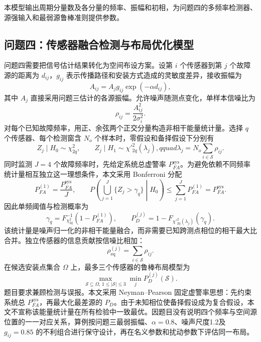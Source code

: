 \documentclass[withoutpreface,bwprint]{cumcmthesis}
\begin{document}
本模型输出周期分量数及各分量的频率、振幅和初相，为问题四的多频率检测器、源强输入和最弱源鲁棒准则提供参数。

\subsection{问题四：传感器融合检测与布局优化模型}

问题四需要把信号估计结果转化为空间布设方案。设第 \(i\) 个传感器到第 \(j\) 个故障源的距离为 \(d_{ij}\)，\(g_{ij}\) 表示传播路径和安装方式造成的灵敏度差异，接收振幅为
\begin{equation}
    A_{ij}=A_jg_{ij}\exp(-\alpha d_{ij}),
    \label{eq:decay}
\end{equation}
其中 \(A_j\) 直接采用问题三估计的各源振幅。允许噪声随测点变化，单样本信噪比为
\begin{equation}
    \rho_{ij}=
    \frac{A_{ij}^2}{2\sigma_i^2}.
    \label{eq:rho}
\end{equation}
对每个已知故障频率，用正、余弦两个正交分量构造非相干能量统计量。选择 \(q\) 个传感器、每个检测窗含 \(N_o\) 个样本时，零假设和备择假设下分别有
\begin{equation}
 Z_j\mid H_0\sim\chi^2_{2q},\qquad
 Z_j\mid H_1\sim\chi'^2_{2q}(\lambda_j),qquad
 \lambda_j=N_o\sum_{i\in\mathcal S}\rho_{ij}.
 \label{eq:dist}
\end{equation}
同时监测 \(J=4\) 个故障频率时，先给定系统总虚警率 \(P_{FA}^{\mathrm{sys}}\)。为避免依赖不同频率统计量相互独立这一理想条件，本文采用 Bonferroni 分配
\begin{equation}
 P_{FA}^{(1)}=\frac{P_{FA}^{\mathrm{sys}}}{J},\qquad
 P\!\left(\bigcup_{j=1}^{J}\{Z_j>\gamma_q\}\middle|H_0\right)
 \leq\sum_{j=1}^{J}P_{FA}^{(1)}=P_{FA}^{\mathrm{sys}}.
 \label{eq:bonferroni}
\end{equation}
因此单频阈值与检测概率为
\begin{equation}
    \gamma_q=F_{\chi^2_{2q}}^{-1}\!\left(1-P_{FA}^{(1)}\right),\qquad
    P_D^{(j)}=1-F_{\chi'^2_{2q}(\lambda_j)}(\gamma_q).
    \label{eq:threshold}
\end{equation}
该统计量是噪声归一化的非相干能量融合，而非需要已知跨测点相位的相干最大比合并。独立传感器的信息贡献按信噪比相加：
\begin{equation}
    \rho_{\mathrm{eq}}^{(j)}
    =
    \sum_{i\in\mathcal S}\rho_{ij}.
    \label{eq:mrc}
\end{equation}
在候选安装点集合 \(\Omega\) 上，最多三个传感器的鲁棒布局模型为
\begin{equation}
    \max_{\mathcal S\subseteq\Omega,\,1\leq|\mathcal S|\leq3}
    \min_j P_D^{(j)}(\mathcal S).
    \label{eq:maxmin}
\end{equation}
题目要求兼顾检测与误报。本文采用 Neyman--Pearson 固定虚警率思想\cite{neyman1933}：先约束系统总 \(P_{FA}^{\mathrm{sys}}\)，再最大化最差源的 \(P_D\)。由于未知相位使备择假设成为复合假设，本文不宣称该能量统计量在所有检验中一致最优。因题目没有说明四个频率与空间源位置的一一对应关系，算例按问题三最弱振幅、\(\alpha=0.8\)、噪声尺度1.2及 \(g_{ij}=0.85\) 的不利组合进行保守设计，再在名义参数和扰动参数下评估同一布局。
\end{document}
